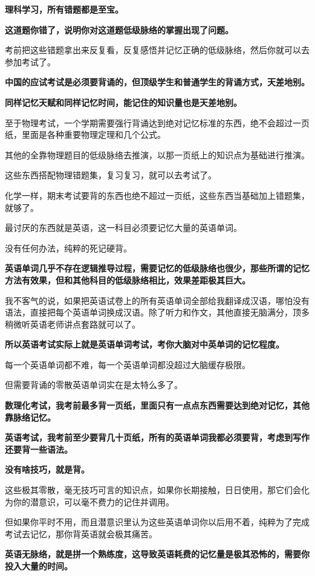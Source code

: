 \documentclass[UTF8, 11pt, oneside]{ctexart}
\newcommand{\zd}[1]{\textbf{\textcolor[RGB]{123,12,0}{#1}}} %
\begin{document}
\zd{理科学习，所有错题都是至宝。}

\zd{这道题你错了，说明你对这道题低级脉络的掌握出现了问题。}

考前把这些错题拿出来反复看，反复感悟并记忆正确的低级脉络，然后你就可以去参加考试了。

\zd{中国的应试考试是必须要背诵的，但顶级学生和普通学生的背诵方式，天差地别。}

\zd{同样记忆天赋和同样记忆时间，能记住的知识量也是天差地别。}

至于物理考试，一个学期需要强行背诵达到绝对记忆标准的东西，绝不会超过一页纸，里面是各种重要物理定理和几个公式。

其他的全靠物理题目的低级脉络去推演，以那一页纸上的知识点为基础进行推演。

这些东西搭配物理错题集，复习复习，就可以去考试了。

化学一样，期末考试要背的东西也绝不超过一页纸，这些东西当基础加上错题集，就够了。

最讨厌的东西就是英语，这一科目必须要记忆大量的英语单词。

没有任何办法，纯粹的死记硬背。

\zd{英语单词几乎不存在逻辑推导过程，需要记忆的低级脉络也很少，那些所谓的记忆方法有效果，但和其他科目的低级脉络相比，效果差距极其巨大。}

我不客气的说，如果把英语试卷上的所有英语单词全部给我翻译成汉语，哪怕没有语法，直接把每个英语单词换成汉语。除了听力和作文，其他直接无脑满分，顶多稍微听英语老师讲点套路就可以了。

\zd{所以英语考试实际上就是英语单词考试，考你大脑对中英单词的记忆程度。}

每一个英语单词都不难，每一个英语单词都没超过大脑缓存极限。

但需要背诵的零散英语单词实在是太特么多了。

\zd{数理化考试，我考前最多背一页纸，里面只有一点点东西需要达到绝对记忆，其他靠脉络记忆。}

\zd{英语考试，我考前至少要背几十页纸，所有的英语单词我都必须要背，考虑到写作还要背一些语法。}

\zd{没有啥技巧，就是背。}

这些极其零散，毫无技巧可言的知识点，如果你长期接触，日日使用，那它们会化为你的潜意识，可以毫不费力的记住并调用。

但如果你平时不用，而且潜意识里认为这些英语单词你以后用不着，纯粹为了完成考试去记忆，那你背英语就会极其痛苦。

\zd{英语无脉络，就是拼一个熟练度，这导致英语耗费的记忆量是极其恐怖的，需要你投入大量的时间。}
\end{document}
